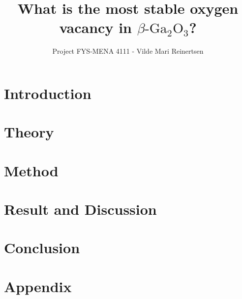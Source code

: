 

\title{What is the most stable oxygen vacancy in $\beta\text{-Ga}_2\text{O}_3$?}
\author{Project FYS-MENA 4111 - Vilde Mari Reinertsen}
\raggedbottom



\maketitle

\begin{abstract}

  
\tableofcontents
\end{abstract}

\twocolumn

\section{Introduction}


\section{Theory}


\section{Method}


\section{Result and Discussion}


%

\section{Conclusion}


\newpage



\section*{Appendix}



